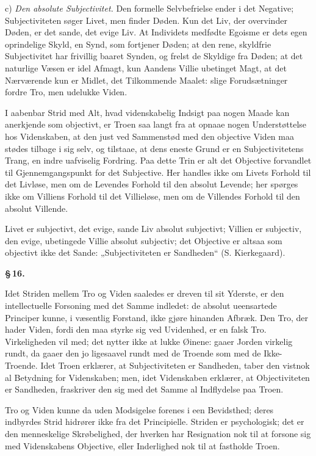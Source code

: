 \documentclass[12pt]{book}
\newcommand{\opage}[1]{\marginnote{\footnotesize\textit{[#1]}}}
\begin{document}
c) \emph{Den absolute Subjectivitet.} Den formelle Selvbefrielse ender i det Negative;
Subjectiviteten søger Livet, men finder Døden. Kun det Liv, der overvinder Døden, er
det sande, det evige Liv. At Individets medfødte Egoisme er dets egen oprindelige
Skyld, en Synd, som fortjener Døden; at den rene, skyldfrie Subjectivitet har frivillig
baaret Synden, og frelst de Skyldige fra Døden; at det naturlige Væsen er idel Afmagt,
kun Aandens Villie ubetinget Magt, at det Nærværende kun er Midlet, det Tilkommende
Maalet: slige Forudsætninger fordre Tro, men udelukke Viden.

I aabenbar Strid med Alt, hvad videnskabelig Indsigt paa nogen Maade kan anerkjende som
objectivt, er Troen saa langt fra at opnaae nogen Understøttelse hos Videnskaben, at
den just ved Sammenstød med den objective
\opage{77} Viden maa stødes tilbage i sig selv, og tilstaae, at dens eneste Grund er en
Subjectivitetens Trang, en indre uafviselig Fordring. Paa dette Trin er alt det
Objective forvandlet til Gjennemgangspunkt for det Subjective. Her handles ikke om
Livets Forhold til det Livløse, men om de Levendes Forhold til den absolut Levende; her
spørges ikke om Villiens Forhold til det Villieløse, men om de Villendes Forhold til
den absolut Villende.

Livet er subjectivt, det evige, sande Liv absolut subjectivt; Villien er subjectiv, den
evige, ubetingede Villie absolut subjectiv; det Objective er altsaa som objectivt ikke
det Sande: „Subjectiviteten er Sandheden“ (S. Kierkegaard).

\begin{center}{\bfseries \S\,16.}\end{center}

Idet Striden mellem Tro og Viden saaledes er dreven til sit Yderste, er den
intellectuelle Forsoning med det Samme indledet: de absolut ueensartede Principer
kunne, i væsentlig Forstand, ikke gjøre hinanden Afbræk. Den Tro, der hader Viden,
fordi den maa styrke sig ved Uvidenhed, er en falsk Tro. Virkeligheden vil med; det
nytter ikke at lukke Øinene: gaaer Jorden virkelig rundt, da gaaer den jo ligesaavel
rundt med de Troende som med de Ikke-Troende. Idet Troen erklærer, at Subjectiviteten
er Sandheden, taber den vistnok al Betydning for Videnskaben; men, idet Videnskaben
erklærer, at Objectiviteten er Sandheden, fraskriver den sig med det Samme al
Indflydelse paa Troen.

Tro og Viden kunne da uden Modsigelse forenes i een Bevidsthed; deres indbyrdes Strid
hidrører ikke fra det Principielle. Striden er psychologisk; det er den menneskelige
Skrøbelighed, der hverken har Resignation nok til at forsone sig med Videnskabens
Objective, eller Inderlighed nok til at fastholde Troen.
\end{document}
